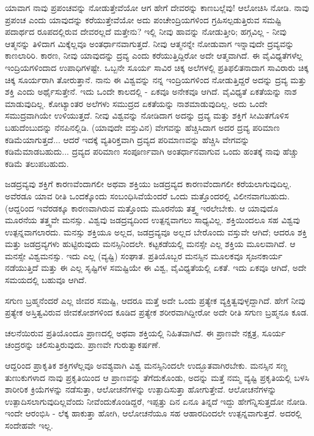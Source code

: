 ಯಾವಾಗ ನಾವು ಪ್ರಪಂಚವನ್ನು ನೋಡುತ್ತೇವೆಯೋ ಆಗ ಹೇಗೆ ದೇವರನ್ನು ಕಾಣಬಲ್ಲೆವು! ಆಲೋಚಿಸಿ ನೋಡಿ. ನಾವು ಪ್ರಪಂಚ ಎಂದು ಯಾವುದನ್ನು ಕರೆಯುತ್ತೇವೆಯೋ ಅದು ಪಂಚೇಂದ್ರಿಯಗಳಿಂದ ಗ್ರಹಿಸಲ್ಪಡುತ್ತಿರುವ ಸಮಷ್ಟಿ ಪದಾರ್ಥದ ರೂಪದಲ್ಲಿರುವ ದೇವರಲ್ಲದೆ ಮತ್ತೇನು? ಇಲ್ಲಿ ನೀವು ಹಾವನ್ನು ನೋಡುತ್ತೀರಿ; ಹಗ್ಗವಿಲ್ಲ - ನೀವು ಆತ್ಮನನ್ನು ತಿಳಿದಾಗ ಮಿಕ್ಕೆಲ್ಲವೂ ಅಂತರ್ಧಾನವಾಗುತ್ತದೆ. ನೀವು ಆತ್ಮನನ್ನೇ ನೋಡುವಾಗ ಇನ್ನಾವುದೇ ದ್ರವ್ಯವನ್ನು ಕಾಣಲಾರಿರಿ. ಕಾರಣ, ನೀವು ಯಾವುದನ್ನು ದ್ರವ್ಯ ಎಂದು ಕರೆಯುತ್ತಿದ್ದಿರೋ ಅದೇ ಆತ್ಮವಾಗಿದೆ. ಈ ವೈವಿಧ್ಯತೆಗಳೆಲ್ಲ ಇಂದ್ರಿಯಗಳಿಂದಾದ ಉಪಾಧಿಗಳಷ್ಟೇ. ಒಬ್ಬನೇ ಸೂರ್ಯ ಸಾವಿರ ಚಿಕ್ಕ ಅಲೆಗಳಲ್ಲಿ ಪ್ರತಿಫಲಿತನಾದಾಗ ಸಾವಿರಾರು ಚಿಕ್ಕ ಚಿಕ್ಕ ಸೂರ್ಯರಾಗಿ ತೋರುತ್ತಾನೆ. ನಾನು ಈ ವಿಶ್ವವನ್ನು ನನ್ನ ಇಂದ್ರಿಯಗಳಿಂದ ನೋಡುತ್ತಿದ್ದರೆ ಅದನ್ನು ದ್ರವ್ಯ ಮತ್ತು ಶಕ್ತಿ ಎಂದು ಅರ್ಥೈಸುತ್ತೇನೆ. ಇದು ಒಂದೇ ಕಾಲದಲ್ಲಿ - ಏಕವೂ ಅನೇಕವೂ ಆಗಿದೆ. ವೈವಿಧ್ಯತೆ ಏಕತೆಯನ್ನು ನಾಶ ಮಾಡುವುದಿಲ್ಲ. ಕೋಟ್ಯಾಂತರ ಅಲೆಗಳು ಸಮುದ್ರದ ಏಕತೆಯನ್ನು ನಾಶಮಾಡುವುದಿಲ್ಲ. ಅದು ಒಂದೇ ಸಮುದ್ರವಾಗಿಯೇ ಉಳಿಯುತ್ತದೆ. ನೀವು ವಿಶ್ವವನ್ನು ನೋಡಿದಾಗ ಅದನ್ನು ದ್ರವ್ಯ ಮತ್ತು ಶಕ್ತಿಗೆ ಸೀಮಿತಗೊಳಿಸ ಬಹುದೆಂಬುದನ್ನು ನೆನಪಿನಲ್ಲಿಡಿ. (ಯಾವುದೇ ವಸ್ತುವಿನ) ವೇಗವನ್ನು ಹೆಚ್ಚಿಸಿದಾಗ ಅದರ ದ್ರವ್ಯ ಪರಿಮಾಣ ಕಡಿಮೆಯಾಗುತ್ತದೆ... ಆದರೆ ಇದಕ್ಕೆ ವ್ಯತಿರಿಕ್ತವಾಗಿ ದ್ರವ್ಯದ ಪರಿಮಾಣವನ್ನು ಹೆಚ್ಚಿಸಿ ವೇಗವನ್ನು ಕಡಿಮೆಮಾಡಬಹುದು... ದ್ರವ್ಯದ ಪರಿಮಾಣ ಸಂಪೂರ್ಣವಾಗಿ ಅಂತರ್ಧಾನವಾಗುವ ಒಂದು ಹಂತಕ್ಕೆ ನಾವು ಹೆಚ್ಚು ಕಡಿಮೆ ತಲುಪಬಹುದು.

ಜಡದ್ರವ್ಯವು ಶಕ್ತಿಗೆ ಕಾರಣವೆಂದಾಗಲೀ ಅಥವಾ ಶಕ್ತಿಯು ಜಡದ್ರವ್ಯದ ಕಾರಣವೆಂದಾಗಲೀ ಕರೆಯಲಾಗುವುದಿಲ್ಲ. ಅವೆರಡೂ ಯಾವ ರೀತಿ ಒಂದಕ್ಕೊಂದು ಸಂಬಂಧಿಸಿವೆಯೆಂದರೆ ಒಂದು ಮತ್ತೊಂದರಲ್ಲಿ ವಿಲೀನವಾಗಬಹುದು. (ಆದ್ದರಿಂದ ಇವೆರಡಕ್ಕೂ ಕಾರಣವಾಗಿರುವ ಮತ್ತೊಂದು ಮೂರನೆಯ ತತ್ತ್ವ ಇರಲೇಬೇಕು. ಆ ಯಾವುದೊ ಮೂರನೆಯ ತತ್ತ್ವವೇ ಮನಸ್ಸು. ವಿಶ್ವವು ಜಡದ್ರವ್ಯದಿಂದ ಉತ್ಪನ್ನವಾಗಲು ಸಾಧ್ಯವಿಲ್ಲ. ಶಕ್ತಿಯಿಂದಲೂ ಸಹ ವಿಶ್ವವು ಉತ್ಪನ್ನವಾಗಲಾರದು. ಮನಸ್ಸು ಶಕ್ತಿಯೂ ಅಲ್ಲದ, ಜಡದ್ರವ್ಯವೂ ಅಲ್ಲದ ಬೇರೊಂದು ವಸ್ತುವೇ ಆಗಿದೆ; ಆದರೂ ಶಕ್ತಿ ಮತ್ತು ಜಡದ್ರವ್ಯಗಳು ಹುಟ್ಟಿರುವುದು ಮನಸ್ಸಿನಿಂದಲೇ. ಕಟ್ಟಕಡೆಯಲ್ಲಿ ಮನಸ್ಸೇ ಎಲ್ಲ ಶಕ್ತಿಯ ಮೂಲವಾಗಿದೆ. ಆ ಮನಸ್ಸೇ ವಿಶ್ವಮನಸ್ಸು. ಇದು ಎಲ್ಲ (ವ್ಯಷ್ಟಿ) ಸಂಘಾತ. ಪ್ರತಿಯೊಬ್ಬರ ಮನಸ್ಸಿನ ಮೂಲಕವೂ ಸೃಜನಕಾರ್ಯ ನಡೆಯುತ್ತಿದೆ ಮತ್ತು ಈ ಎಲ್ಲ ಸೃಷ್ಟಿಗಳ ಸಮಷ್ಟಿಯೇ ಈ ವಿಶ್ವ, ವೈವಿಧ್ಯತೆಯಲ್ಲಿ ಏಕತೆ. ಇದು ಏಕವೂ ಆಗಿದೆ, ಅದೇ ಸಮಯದಲ್ಲಿ ಬಹುವೂ ಆಗಿದೆ.

ಸಗುಣ ಬ್ರಹ್ಮನೆಂದರೆ ಎಲ್ಲ ಜೀವರ ಸಮಷ್ಟಿ, ಆದರೂ ಮತ್ತೆ ಅದೇ ಒಂದು ಪ್ರತ್ಯೇಕ ವ್ಯಕ್ತಿತ್ವವುಳ್ಳದ್ದಾಗಿದೆ. ಹೇಗೆ ನೀವು ಪ್ರತ್ಯೇಕ ಅಸ್ತಿತ್ವವಿರುವ ಜೀವಕೋಶಗಳಿಂದ ಕೂಡಿದ ಪ್ರತ್ಯೇಕ ಶರೀರವಾಗಿದ್ದೀರೋ ಅದೇ ರೀತಿ ಸಗುಣ ಬ್ರಹ್ಮನೂ ಕೂಡ.

ಚಲನೆಯಿರುವ ಪ್ರತಿಯೊಂದೂ ಪ್ರಾಣದಲ್ಲಿ ಅಥವಾ ಶಕ್ತಿಯಲ್ಲಿ ನಿಹಿತವಾಗಿದೆ. ಈ ಪ್ರಾಣವೇ ನಕ್ಷತ್ರ, ಸೂರ್ಯ ಚಂದ್ರರನ್ನು ಚಲಿಸುತ್ತಿರುವುದು. ಪ್ರಾಣವೇ ಗುರುತ್ವಾಕರ್ಷಣೆ.

ಆದ್ದರಿಂದ ಪ್ರಾಕೃತಿಕ ಶಕ್ತಿಗಳೆಲ್ಲವೂ ಅವಶ್ಯವಾಗಿ ವಿಶ್ವ ಮನಸ್ಸಿನಿಂದಲೇ ಉದ್ಭೂತವಾಗಿರಬೇಕು. ಮನಸ್ಸಿನ ಸಣ್ಣ ತುಣುಕುಗಳಾದ ನಾವು ಪ್ರಕೃತಿಯಿಂದ ಆ ಪ್ರಾಣವನ್ನು ತೆಗೆದುಕೊಂಡು, ಅದನ್ನು ಮತ್ತೆ ನಮ್ಮ ವ್ಯಷ್ಟಿ ಪ್ರಕೃತಿಯಲ್ಲಿ ಬಳಸಿ ಶಾರೀರಿಕ ಕ್ರಿಯೆಗಳನ್ನು ನಡೆಸುತ್ತಾ, ಆಲೋಚನೆಗಳನ್ನು ಉತ್ಪಾದಿಸುತ್ತಾ ಹೋಗುತ್ತೇವೆ. ಆಲೋಚನೆಗಳನ್ನು ಉತ್ಪಾದಿಸಲಾಗುವುದಿಲ್ಲವೆಂದು ನೀವೆಂದುಕೊಂಡಿದ್ದರೆ, ಇಪ್ಪತ್ತು ದಿನ ಏನೂ ತಿನ್ನದೆ ಇದ್ದು ಹೇಗೆನ್ನಿಸುತ್ತದೋ ನೋಡಿ. ಇಂದೇ ಆರಂಭಿಸಿ - ಲೆಕ್ಕ ಹಾಕುತ್ತಾ ಹೋಗಿ, ಆಲೋಚನೆಯೂ ಸಹ ಆಹಾರದಿಂದಲೇ ಉತ್ಪನ್ನವಾಗುತ್ತದೆ. ಅದರಲ್ಲಿ ಸಂದೇಹವೇ ಇಲ್ಲ.

